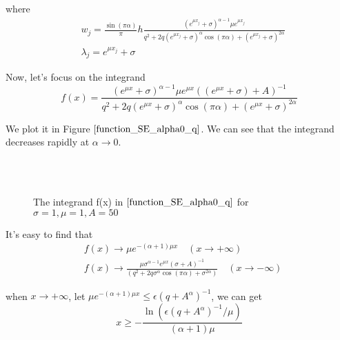 where
\begin{equation}
	\begin{aligned}
		& w_j=\frac{\sin(\pi\alpha)}{\pi}h\frac{(e^{\mu x_j}+\sigma)^{\alpha-1}\mu e^{\mu x_j}}{q^2+2q(e^{\mu x_j}+\sigma)^{\alpha}\cos(\pi\alpha)+(e^{\mu x_j}+\sigma)^{2\alpha}}\\
		& \lambda_j=e^{\mu x_j}+\sigma
	\end{aligned}
\label{lw_SE0_q}
\end{equation}

Now, let's focus on the integrand
\begin{equation}
	f(x)=\frac{(e^{\mu x}+\sigma)^{\alpha-1}\mu e^{\mu x}((e^{\mu x}+\sigma)+{A})^{-1}}{q^2+2q(e^{\mu x}+\sigma)^{\alpha}\cos(\pi\alpha)+(e^{\mu x}+\sigma)^{2\alpha}}
\end{equation}


We plot it in Figure $\ref{function_SE_alpha0_q}$. We can see that the integrand decreases rapidly at $\alpha \rightarrow 0$.
\begin{figure}[htbp]
	\centering
	~~
	~~
	\\
	~~
	~~
	\caption{The integrand f(x) in $\eqref{function_SE_alpha0_q}$ for $\sigma=1,\mu=1,A=50$}
	\label{function_SE_alpha0_q}
\end{figure}

It's easy to find that
\begin{equation}
	\begin{aligned}
		& f(x)\rightarrow \mu e^{-(\alpha+1) \mu x}\quad (x \rightarrow +\infty)\\
		& f(x)\rightarrow \frac{\mu \sigma^{\alpha-1}e^{\mu x}(\sigma+A)^{-1}}{(q^2+2q\sigma^{\alpha}\cos(\pi\alpha)+\sigma^{2\alpha})}\quad (x \rightarrow -\infty)
	\end{aligned}
\end{equation}

when $x\rightarrow +\infty$, let $\mu e^{-(\alpha+1)\mu x}\leq \epsilon (q+A^{\alpha})^{-1}$, we can get
\begin{equation}
	x\geq -\frac{\ln(\epsilon (q+A^{\alpha})^{-1}/\mu)}{(\alpha+1)\mu}
\end{equation}

